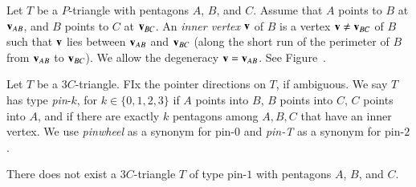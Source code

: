 \begin{definition} Let $T$ be a $P$-triangle with pentagons $A$, $B$,
  and $C$.  Assume that $A$ points to $B$ at ${\mathbf v}_{AB}$, and $B$ points
  to $C$ at ${\mathbf v}_{BC}$.  An {\it inner vertex} ${\mathbf v}$ of $B$ is a vertex
  ${\mathbf v}\ne {\mathbf v}_{BC}$ of $B$ such that ${\mathbf v}$ lies between ${\mathbf v}_{AB}$ and
  ${\mathbf v}_{BC}$ (along the short run of the perimeter of $B$ from
  ${\mathbf v}_{AB}$ to ${\mathbf v}_{BC}$).  We allow the degeneracy ${\mathbf v}={\mathbf v}_{AB}$.
  See Figure~.
\end{definition}

\begin{definition} Let $T$ be a $3C$-triangle.  FIx the pointer
  directions on $T$, if ambiguous. We say $T$ has type {\it pin}-$k$,
  for $k\in \{0,1,2,3\}$ if $A$ points into $B$, $B$ points into $C$,
  $C$ points into $A$, and if there are exactly $k$ pentagons among
  $A,B,C$ that have an inner vertex.  We use {\it pinwheel} as a
  synonym for pin-$0$ and {\it pin-T} as a synonym for pin-$2$.
\end{definition}


\begin{lemma} There does not exist a $3C$-triangle $T$ of type pin-$1$
  with pentagons $A$, $B$, and $C$.
\end{lemma}


